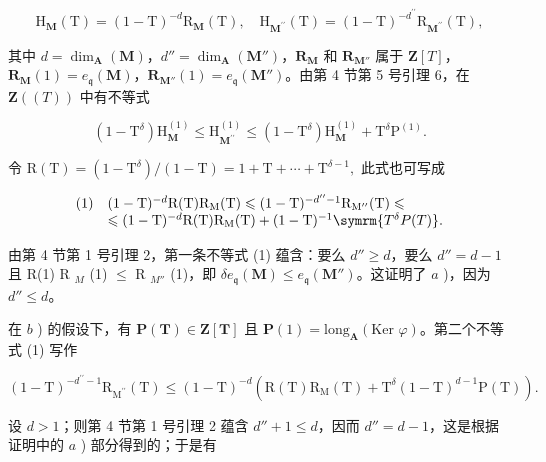 \[
\mathrm{H} _ {\mathbf {M}} (\mathrm{T}) = (1 - \mathrm{T}) ^ {- d} \mathrm{R} _ {\mathbf {M}} (\mathrm{T}), \quad \mathrm{H} _ {\mathbf {M} ^ {\prime \prime}} (\mathrm{T}) = (1 - \mathrm{T}) ^ {- d ^ {\prime \prime}} \mathrm{R} _ {\mathbf {M} ^ {\prime \prime}} (\mathrm{T}),
\]

其中 \(d = \dim_{\mathbf{A}}(\mathbf{M})\)，\(d'' = \dim_{\mathbf{A}}(\mathbf{M}'')\)，\(\mathbf{R}_{\mathbf{M}}\) 和 \(\mathbf{R}_{\mathbf{M}''}\) 属于 \(\mathbf{Z}[T]\)，\(\mathbf{R}_{\mathbf{M}}(1) = e_{\mathfrak{q}}(\mathbf{M})\)，\(\mathbf{R}_{\mathbf{M}''}(1) = e_{\mathfrak{q}}(\mathbf{M}'')\)。由第 4 节第 5 号引理 6，在 \(\mathbf{Z}((T))\) 中有不等式

\[
\left(1 - \mathrm{T} ^ {\delta}\right) \mathrm{H} _ {\mathbf {M}} ^ {(1)} \leqslant \mathrm{H} _ {\mathbf {M} ^ {\prime \prime}} ^ {(1)} \leqslant \left(1 - \mathrm{T} ^ {\delta}\right) \mathrm{H} _ {\mathbf {M}} ^ {(1)} + \mathrm{T} ^ {\delta} \mathrm{P} ^ {(1)}.
\]

令 \(\mathrm{R}(\mathrm{T}) = (1 - \mathrm{T}^{\delta}) / (1 - \mathrm{T}) = 1 + \mathrm{T} + \cdots + \mathrm{T}^{\delta-1},\) 此式也可写成

\[
\begin{array}{r l} (1) & (1 - \mathrm{T}) ^ {- d} \mathrm{R(T)} \mathrm {R_ {M} (T)} \leqslant (1 - \mathrm{T}) ^ {- d ^ {\prime \prime} - 1} \mathrm {R_ {M^ {\prime\prime}} (T)} \leqslant \\ & \leqslant (1 - \mathrm{T}) ^ {- d} \mathrm{R(T)} \mathrm {R_ {M} (T)} + (1 - \mathrm{T}) ^ {- 1} \symrm {T^ {\delta} P(T)}. \end{array}
\]

由第 4 节第 1 号引理 2，第一条不等式 (1) 蕴含：要么 \(d'' \geqslant d\)，要么 \(d'' = d - 1\) 且 R(1) R \(_{M}\) (1) \(\leqslant\) R \(_{M''}\) (1)，即 \(\delta e_{\mathfrak{q}}(\mathbf{M}) \leqslant e_{\mathfrak{q}}(\mathbf{M}'')\)。这证明了 \(a\) )，因为 \(d'' \leqslant d\)。

在 \(b\) ) 的假设下，有 \(\mathbf{P}(\mathbf{T}) \in \mathbf{Z}[\mathbf{T}]\) 且 \(\mathbf{P}(1) = \text{long}_{\mathbf{A}}(\text{Ker } \varphi)\)。第二个不等式 (1) 写作

\[
(1 - \mathrm{T}) ^ {- d ^ {\prime \prime} - 1} \mathrm{R} _ {\mathrm{M} ^ {\prime \prime}} (\mathrm{T}) \leqslant (1 - \mathrm{T}) ^ {- d} \left(\mathrm{R} (\mathrm{T}) \mathrm{R} _ {\mathrm{M}} (\mathrm{T}) + \mathrm{T} ^ {\delta} (1 - \mathrm{T}) ^ {d - 1} \mathrm{P} (\mathrm{T})\right).
\]

设 \(d > 1\)；则第 4 节第 1 号引理 2 蕴含 \(d'' + 1 \leqslant d\)，因而 \(d'' = d - 1\)，这是根据证明中的 \(a\) ) 部分得到的；于是有

